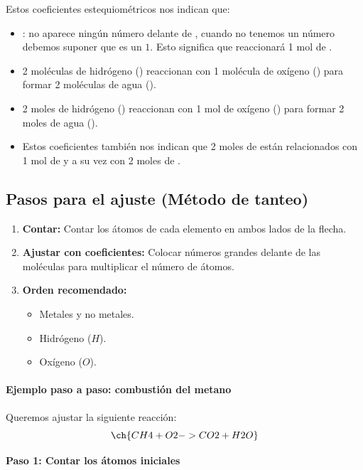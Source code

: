 Estos coeficientes estequiométricos nos indican que:
\begin{itemize}
    \item {}: no aparece ningún número delante de , cuando no tenemos un número debemos suponer que es un \( 1 \). Esto significa que reaccionará 1 mol de .
    \item 2 moléculas de hidrógeno () reaccionan con 1 molécula de oxígeno () para formar 2 moléculas de agua ().
    \item 2 moles de hidrógeno () reaccionan con 1 mol de oxígeno () para formar 2 moles de agua ().
    \item Estos coeficientes también nos indican que 2 moles de  están relacionados con 1 mol de  y a su vez con 2 moles de .

\end{itemize}

\subsection{Pasos para el ajuste (Método de tanteo)}

\begin{enumerate}
    \item \textbf{Contar:} Contar los átomos de cada elemento en ambos lados de la flecha.
    \item \textbf{Ajustar con coeficientes:} Colocar números grandes delante de las moléculas para multiplicar el número de átomos.
    \item \textbf{Orden recomendado:}
    \begin{itemize}
        \item Metales y no metales.
        \item Hidrógeno ($H$).
        \item Oxígeno ($O$).
    \end{itemize}
\end{enumerate}

\paragraph{Ejemplo paso a paso: combustión del metano}

Queremos ajustar la siguiente reacción:
\[ \ch{CH4 + O2 -> CO2 + H2O} \]

        {\noindent  \textbf{Paso 1: Contar los átomos iniciales}}

